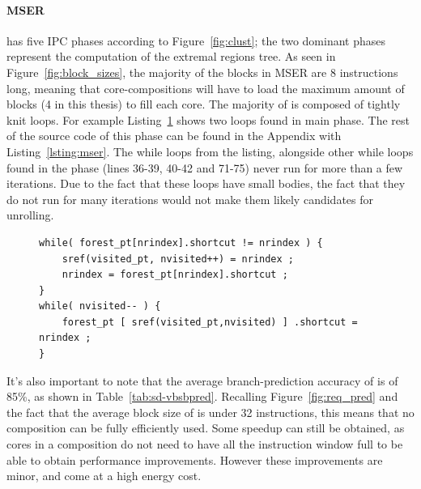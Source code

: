 \paragraph*{MSER}
 has five IPC phases according to Figure~\ref{fig:clust}; the two dominant phases represent the computation of the extremal regions tree.
As seen in Figure~\ref{fig:block_sizes}, the majority of the blocks in MSER are 8 instructions long, meaning that core-compositions will have to load the maximum amount of blocks (4 in this thesis) to fill each core.
The majority of  is composed of tightly knit loops.
For example Listing~\ref{lst:mser-ex} shows two loops found in  main phase.
The rest of the source code of this phase can be found in the Appendix with Listing~\ref{lsting:mser}.
The while loops from the listing, alongside other while loops found in the phase (lines 36-39, 40-42 and 71-75) never run for more than a few iterations.
Due to the fact that these loops have small bodies, the fact that they do not run for many iterations would not make them likely candidates for unrolling.

\begin{figure}[t]
\lstset{language=C,numbersep=4pt}
\begin{center}
\begin{lstlisting}[firstnumber=27]
while( forest_pt[nrindex].shortcut != nrindex ) {          
	sref(visited_pt, nvisited++) = nrindex ;
	nrindex = forest_pt[nrindex].shortcut ;
}      
while( nvisited-- ) {
	forest_pt [ sref(visited_pt,nvisited) ] .shortcut = nrindex ;
}
\end{lstlisting}
\end{center}
\label{lst:mser-ex}\vspace{1em}

\end{figure}

It's also important to note that the average branch-prediction accuracy of  is of 85\%, as shown in Table~\ref{tab:sd-vbsbpred}.
Recalling Figure~\ref{fig:req_pred} and the fact that the average block size of  is under 32 instructions, this means that no composition can be fully efficiently used.
Some speedup can still be obtained, as cores in a composition do not need to have all the instruction window full to be able to obtain performance improvements.
However these improvements are minor, and come at a high energy cost.

